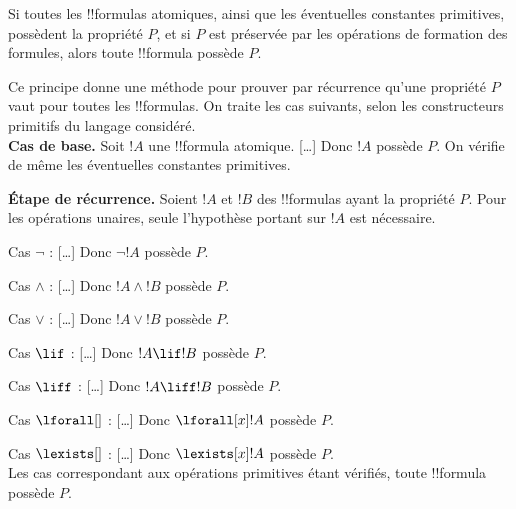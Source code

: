 \documentclass[../../../include/open-logic-section]{subfiles}
\begin{document}
\begin{defn}
Si toutes les !!{formula}s atomiques, ainsi que les éventuelles
constantes primitives, possèdent la propriété $P$, et si $P$ est
préservée par les opérations de formation des formules, alors toute
!!{formula} possède $P$.
\end{defn}

\begin{explain}
Ce principe donne une méthode pour prouver par récurrence
qu'une propriété $P$ vaut pour toutes les !!{formula}s. On traite les
cas suivants, selon les constructeurs primitifs du langage considéré.\\

\textbf{Cas de base.} Soit $!A$ une !!{formula} atomique.
[\ldots] Donc $!A$ possède $P$. On vérifie de même les éventuelles
constantes primitives.

\textbf{Étape de récurrence.} Soient $!A$ et $!B$ des !!{formula}s
ayant la propriété $P$. Pour les opérations unaires, seule
l'hypothèse portant sur $!A$ est nécessaire.

Cas $\lnot$ : [\ldots] Donc $\lnot !A$ possède $P$.

Cas $\land$ : [\ldots] Donc $!A\land !B$ possède $P$.

Cas $\lor$ : [\ldots] Donc $!A\lor !B$ possède $P$.

Cas $\lif$ : [\ldots] Donc $!A\lif !B$ possède $P$.

Cas $\liff$ : [\ldots] Donc $!A\liff !B$ possède $P$.

Cas $\lforall[]$ : [\ldots] Donc $\lforall[x] !A$ possède $P$.

Cas $\lexists[]$ : [\ldots] Donc $\lexists[x] !A$ possède $P$.\\

Les cas correspondant aux opérations primitives étant vérifiés,
toute !!{formula} possède $P$.
\end{explain}
\end{document}
